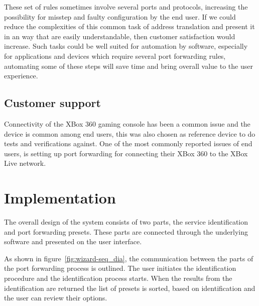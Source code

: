 \documentclass[a4paper,11pt,makeidx]{kth-bcs}
\begin{document}
These set of rules sometimes involve several ports and protocols, increasing the possibility for misstep and faulty configuration by the end user.
If we could reduce the complexities of this common task of address translation and present it in an way that are easily understandable, then customer satisfaction would increase.
Such tasks could be well suited for automation by software, especially for applications and devices which require several port forwarding rules, automating some of these steps will save time and bring overall value to the user experience.


   \section{Customer support}
Connectivity of the XBox 360 gaming console has been a common issue and the device is common among end users, this was also chosen as reference device to do tests and verifications against.
One of the most commonly reported issues of end users, is setting up port forwarding for connecting their XBox 360 to the XBox Live network.

\chapter{Implementation}
The overall design of the system consists of two parts, the service identification and port forwarding presets.
These parts are connected through the underlying software and presented on the user interface.

As shown in figure~\ref{fig:wizard-seq_dia}, the communication between the parts of the port forwarding process is outlined.
The user initiates the identification procedure and the identification process starts.
When the results from the identification are returned the list of presets is sorted, based on identification and the user can review their options.
\end{document}
